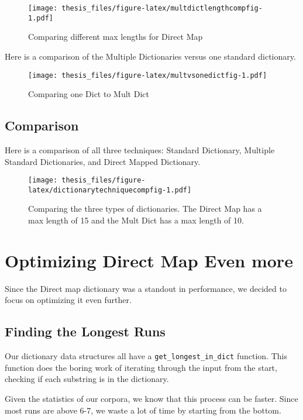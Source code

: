\documentclass[12pt,twoside]{reedthesis}
\begin{document}
\begin{figure}
\centering
\texttt{[image: thesis\_files/figure-latex/multdictlengthcompfig-1.pdf]}
\caption{\label{fig:multdictlengthcompfig}Comparing different max lengths for Direct Map}
\end{figure}
Here is a comparison of the Multiple Dictionaries versus one standard dictionary.
\begin{figure}
\centering
\texttt{[image: thesis\_files/figure-latex/multvsonedictfig-1.pdf]}
\caption{\label{fig:multvsonedictfig}Comparing one Dict to Mult Dict}
\end{figure}
\hypertarget{comparison}{%
\subsection{Comparison}\label{comparison}}

Here is a comparison of all three techniques: Standard Dictionary, Multiple Standard Dictionaries, and Direct Mapped Dictionary.
\begin{figure}
\centering
\texttt{[image: thesis\_files/figure-latex/dictionarytechniquecompfig-1.pdf]}
\caption{\label{fig:dictionarytechniquecompfig}Comparing the three types of dictionaries. The Direct Map has a max length of 15 and the Mult Dict has a max length of 10.}
\end{figure}
\hypertarget{optimizing-direct-map-even-more}{%
\section{Optimizing Direct Map Even more}\label{optimizing-direct-map-even-more}}

Since the Direct map dictionary was a standout in performance, we decided to focus on optimizing it even further.

\hypertarget{finding-the-longest-runs}{%
\subsection{Finding the Longest Runs}\label{finding-the-longest-runs}}

Our dictionary data structures all have a \texttt{get\_longest\_in\_dict} function. This function does the boring work of iterating through the input from the start, checking if each substring is in the dictionary.

Given the statistics of our corpora, we know that this process can be faster. Since most runs are above 6-7, we waste a lot of time by starting from the bottom.
\end{document}

